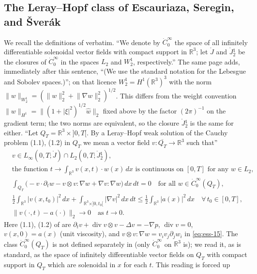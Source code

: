 \documentclass[11pt]{article}
\theoremstyle{definition}
\theoremstyle{plain}
\newcommand{\R}{\mathbb R}
\newcommand{\norm}[1]{\lVert #1\rVert}
\begin{document}
\subsection{The Leray--Hopf class of Escauriaza, Seregin, and \v Sver\'ak}

We recall the definitions of \cite[p.~212]{ESS2003} verbatim.  ``We denote by
$\dot C_0^\infty$ the space of all infinitely differentiable solenoidal vector
fields with compact support in $\R^3$; let $\mathring J$ and $\mathring J{}^1_2$
be the closures of $\dot C_0^\infty$ in the spaces $L_2$ and $W^1_2$,
respectively.''  The same page adds, immediately after this sentence, ``(We
use the standard notation for the Lebesgue and Sobolev spaces.)''; on that
licence $W^1_2=H^1(\R^3)^3$ with the norm
$\norm w_{W^1_2}=(\norm w_2^2+\norm{\nabla w}_2^2)^{1/2}$.  This differs from
the weight convention $\norm w_{H^1}=\norm{(1+|\xi|^2)^{1/2}\hat w}_2$ fixed
above by the factor $(2\pi)^{-1}$ on the gradient term; the two norms are
equivalent, so the closure $\mathring J{}^1_2$ is the same for either.
``Let $Q_T=\R^3\times{]0,T[}$.  By a Leray--Hopf weak solution of the Cauchy
problem (1.1), (1.2) in $Q_T$ we mean a vector field
$v\colon\overline{Q_T}\to\R^3$ such that''
\begin{align}
 &v\in L_\infty(0,T;\mathring J)\cap L_2(0,T;\mathring J{}^1_2),
 \label{eq:ess-13}\\
 &\text{the function }t\to\int_{\R^3}v(x,t)\cdot w(x)\,dx\text{ is continuous on }
 [0,T]\text{ for any }w\in L_2,\label{eq:ess-14}\\
 &\int_{Q_T}\big(-v\cdot\partial_tw-v\otimes v:\nabla w+\nabla v:\nabla w\big)
 \,dx\,dt=0\quad\text{for all }w\in\dot C_0^\infty(Q_T),\label{eq:ess-15}\\
 &\frac12\int_{\R^3}|v(x,t_0)|^2\,dx+\int_{\R^3\times]0,t_0[}|\nabla v|^2\,dx\,dt
 \leq\frac12\int_{\R^3}|a(x)|^2\,dx\quad\forall\,t_0\in[0,T],\label{eq:ess-16}\\
 &\norm{v(\cdot,t)-a(\cdot)}_2\to0\quad\text{as }t\to0.\label{eq:ess-17}
\end{align}
Here (1.1), (1.2) of \cite{ESS2003} are
$\partial_tv+\operatorname{div}v\otimes v-\Delta v=-\nabla p$,
$\operatorname{div}v=0$, $v(x,0)=a(x)$ (unit viscosity), and
$v\otimes v:\nabla w=v_iv_j\partial_jw_i$ in \eqref{eq:ess-15}.  The class
$\dot C_0^\infty(Q_T)$ is not defined separately in \cite{ESS2003} (only
$\dot C_0^\infty$ on $\R^3$ is); we read it, as is standard, as the space of
infinitely differentiable vector fields on $Q_T$ with compact support in
$Q_T$ which are solenoidal in $x$ for each $t$.  This reading is forced up
\end{document}
